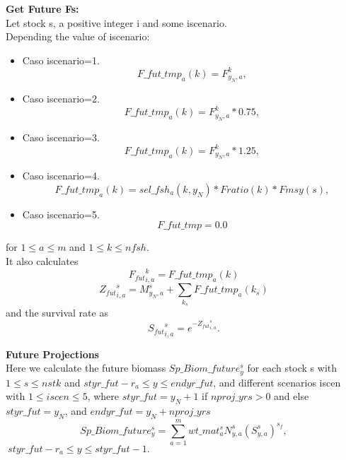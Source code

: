 \documentclass{article}
\begin{document}
\textbf{Get Future Fs:}\\
Let stock s, a positive integer i and some iscenario.\\
Depending the value of iscenario:
\begin{itemize}
    \item Caso iscenario=1. \begin{equation}
        F\_fut\_tmp_a(k)=F^k_{y_N,a},
    \end{equation}
    \item Caso iscenario=2.  \begin{equation}
        F\_fut\_tmp_a(k) = F^k_{y_N,a}*0.75,
    \end{equation}
    \item Caso iscenario=3.  \begin{equation}
        F\_fut\_tmp_a(k) = F^{k}_{y_N,a}*1.25,
    \end{equation}
    \item Caso iscenario=4.
    \begin{equation}
        F\_fut\_tmp_a(k)=sel\_fsh_a(k,y_N)*Fratio(k)*Fmsy(s),
    \end{equation}
    
    \item Caso iscenario=5.
    \begin{equation}
        F\_fut\_tmp = 0.0
    \end{equation}
\end{itemize}
for $1\leq a \leq m$ and  $1\leq k \leq nfsh$.\\
It also calculates
\begin{equation}
    {F_{fut}}^k_{i,a}   = F\_fut\_tmp_a(k)
\end{equation}
\begin{equation}
    {Z_{fut}}^s_{i,a}=M^s_{y_N,a}+\sum_{k_s}F\_fut\_tmp_a(k_s)
\end{equation}
and the survival rate as
\begin{equation}
    {S_{fut}}^s_{i,a}=e^{-{Z_{fut}}^s_{i,a}}.
\end{equation}


\textbf{Future Projections}\\
Here we calculate the future biomass $Sp\_Biom\_future^s_{y}$ for each stock s with $1 \leq s \leq nstk$ and $styr\_fut-r_a\leq y \leq endyr\_fut$, and different scenarios iscen with $1\leq iscen \leq 5$, where $styr\_fut=y_N+1$ if $nproj\_yrs>0$ and else $styr\_fut=y_N$, and $endyr\_fut=y_N+nproj\_yrs$
\begin{equation}
    Sp\_Biom\_future^s_y=\sum_{a=1}^mwt\_{mat}^s_a N^s_{y,a}(S^s_{y,a})^{s_f}, 
\end{equation}
$\ styr\_fut-r_a\leq y \leq styr\_fut-1.$\\
\end{document}
